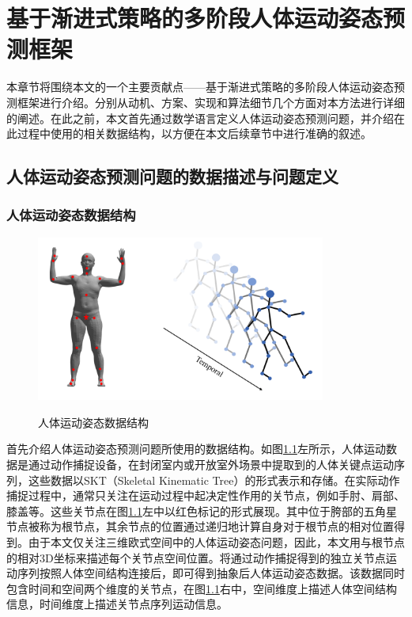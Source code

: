 \chapter{基于渐进式策略的多阶段人体运动姿态预测框架}\label{chapter-5}
本章节将围绕本文的一个主要贡献点——基于渐进式策略的多阶段人体运动姿态预测框架进行介绍。分别从动机、方案、实现和算法细节几个方面对本方法进行详细的阐述。在此之前，本文首先通过数学语言定义人体运动姿态预测问题，并介绍在此过程中使用的相关数据结构，以方便在本文后续章节中进行准确的叙述。
\section{人体运动姿态预测问题的数据描述与问题定义}
\subsection{人体运动姿态数据结构}
\begin{figure}[ht]
    \centering
    \includegraphics[width=0.85\textwidth]{FigMa/show_structure.png}\\
    \vspace{-0.3cm}
    \caption{人体运动姿态数据结构}
    \label{fig:data_structure}
\end{figure}
首先介绍人体运动姿态预测问题所使用的数据结构。如图\ref{fig:data_structure}左所示，人体运动数据是通过动作捕捉设备，在封闭室内或开放室外场景中提取到的人体关键点运动序列，这些数据以SKT（Skeletal Kinematic Tree）的形式表示和存储。在实际动作捕捉过程中，通常只关注在运动过程中起决定性作用的关节点，例如手肘、肩部、膝盖等。这些关节点在图\ref{fig:data_structure}左中以红色标记的形式展现。其中位于胯部的五角星节点被称为根节点，其余节点的位置通过递归地计算自身对于根节点的相对位置得到。由于本文仅关注三维欧式空间中的人体运动姿态问题，因此，本文用与根节点的相对3D坐标来描述每个关节点空间位置。将通过动作捕捉得到的独立关节点运动序列按照人体空间结构连接后，即可得到抽象后人体运动姿态数据。该数据同时包含时间和空间两个维度的关节点，在图\ref{fig:data_structure}右中，空间维度上描述人体空间结构信息，时间维度上描述关节点序列运动信息。

